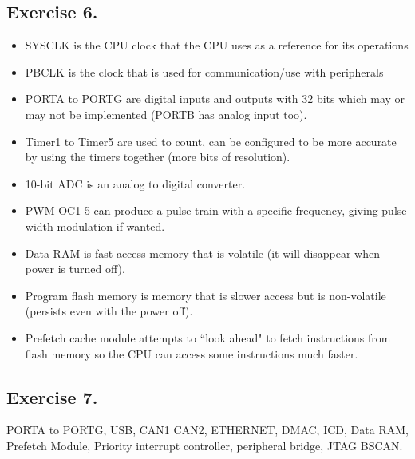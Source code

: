 \documentclass[12pt]{article}
\begin{document}
\subsection*{Exercise 6.}
\begin{itemize}
    \item 
    SYSCLK is the CPU clock that the CPU uses as a reference for its operations

    \item 
    PBCLK is the clock that is used for communication/use with peripherals 

    \item 
    PORTA to PORTG are digital inputs and outputs with 32 bits which may or may not be implemented (PORTB has analog input too).

    \item 
    Timer1 to Timer5 are used to count, can be configured to be more accurate by using the timers together (more bits of resolution).

    \item 
    10-bit ADC is an analog to digital converter. 

    \item 
    PWM OC1-5 can produce a pulse train with a specific frequency, giving pulse width modulation if wanted.

    \item
    Data RAM is fast access memory that is volatile (it will disappear when power is turned off).

    \item
    Program flash memory is memory that is slower access but is non-volatile (persists even with the power off).

    \item
    Prefetch cache module attempts to ``look ahead" to fetch instructions from flash memory so the CPU can access some instructions much faster.

\end{itemize}

\subsection*{Exercise 7.}
PORTA to PORTG, USB, CAN1 CAN2, ETHERNET, DMAC, ICD, Data RAM, Prefetch Module, Priority interrupt controller, peripheral bridge, JTAG BSCAN. 
\end{document}
